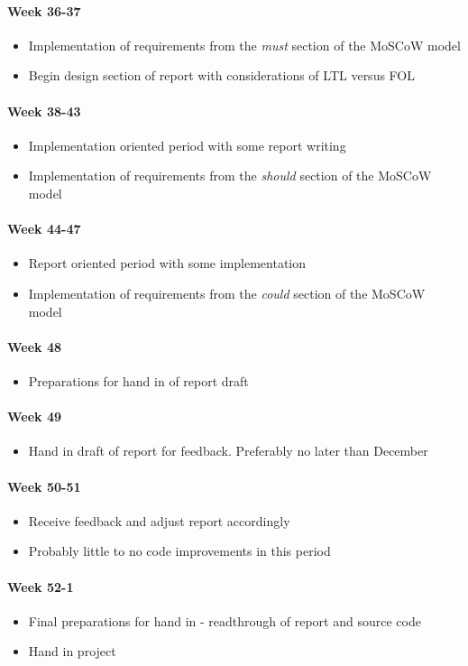 \paragraph{Week 36-37}
\begin{itemize}
    \item Implementation of requirements from the \emph{must} section of the MoSCoW model
    \item Begin design section of report with considerations of LTL versus FOL
\end{itemize}
\paragraph{Week 38-43}
\begin{itemize}
    \item Implementation oriented period with some report writing
    \item Implementation of requirements from the \emph{should} section of the MoSCoW model
\end{itemize}
\paragraph{Week 44-47}
\begin{itemize}
    \item Report oriented period with some implementation
    \item Implementation of requirements from the \emph{could} section of the MoSCoW model
\end{itemize}
\paragraph{Week 48}
\begin{itemize}
    \item Preparations for hand in of report draft
\end{itemize}
\paragraph{Week 49}
\begin{itemize}
    \item Hand in draft of report for feedback. Preferably no later than  December
\end{itemize}
\paragraph{Week 50-51}
\begin{itemize}
    \item Receive feedback and adjust report accordingly
    \item Probably little to no code improvements in this period
\end{itemize}
\paragraph{Week 52-1}
\begin{itemize}
    \item Final preparations for hand in - readthrough of report and source code
    \item Hand in project
\end{itemize}